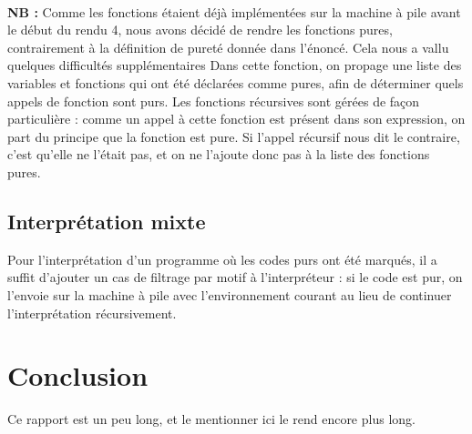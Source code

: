 \paragraph{} \textbf{NB :} Comme les fonctions étaient déjà implémentées sur la machine à pile avant le début du rendu 4, nous avons décidé de rendre les fonctions pures, contrairement à la définition de pureté donnée dans l'énoncé. Cela nous a vallu quelques difficultés supplémentaires
Dans cette fonction, on propage une liste des variables et fonctions qui ont été déclarées comme pures, afin de déterminer quels appels de fonction sont purs. Les fonctions récursives sont gérées de façon particulière : comme un appel à cette fonction est présent dans son expression, on part du principe que la fonction est pure. Si l'appel récursif nous dit le contraire, c'est qu'elle ne l'était pas, et on ne l'ajoute donc pas à la liste des fonctions pures.

\subsection{Interprétation mixte}

Pour l'interprétation d'un programme où les codes purs ont été marqués, il a suffit d'ajouter un cas de filtrage par motif à l'interpréteur : si le code est pur, on l'envoie sur la machine à pile avec l'environnement courant au lieu de continuer l'interprétation récursivement.

\section*{Conclusion}

Ce rapport est un peu long, et le mentionner ici le rend encore plus long.